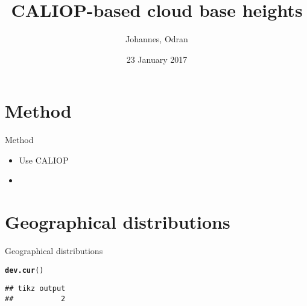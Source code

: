 \documentclass[10pt,notes=all,aspectratio=1610]{beamer}\usepackage[]{graphicx}\usepackage[]{color}
\title{CALIOP-based cloud base heights} \subtitle{} \date{23 January 2017}
\author{Johannes, Odran}
\makeatletter
\newcommand{\hlstd}[1]{\textcolor[rgb]{0.345,0.345,0.345}{#1}}%
\newcommand{\hlkwd}[1]{\textcolor[rgb]{0.737,0.353,0.396}{\textbf{#1}}}%
\newenvironment{kframe}{%
 \def\at@end@of@kframe{}%
 \ifinner\ifhmode%
  \def\at@end@of@kframe{\end{minipage}}%
  \begin{minipage}{\columnwidth}%
 \fi\fi%
 \def\FrameCommand##1{\hskip\@totalleftmargin \hskip-\fboxsep
 \colorbox{shadecolor}{##1}\hskip-\fboxsep
     \hskip-\linewidth \hskip-\@totalleftmargin \hskip\columnwidth}%
 \MakeFramed {\advance\hsize-\width
   \@totalleftmargin\z@ \linewidth\hsize
   \@setminipage}}%
 {\par\unskip\endMakeFramed%
 \at@end@of@kframe}
\newenvironment{knitrout}{}{} %
\makeatother
\begin{document}
\begin{frame}
  \titlepage
\end{frame}

  


\section{Method}
\begin{frame}{Method}
  \begin{itemize}
  \item Use CALIOP
  \item 
  \end{itemize}
  
\end{frame}

\section{Geographical distributions}
\begin{frame}[fragile]{Geographical distributions}
\begin{knitrout}
\color{fgcolor}\begin{kframe}
\begin{alltt}
\hlkwd{dev.cur}\hlstd{()}
\end{alltt}
\begin{verbatim}
## tikz output 
##           2
\end{verbatim}
\end{kframe}
\end{knitrout}
\end{frame}
\end{document}
